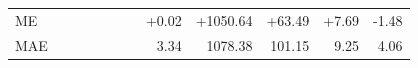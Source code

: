 \begin{tabular}{@{}l r rrrrr rrrrr@{}}
\midrule
ME &  &  &  &  &  &  & \textcolor{pyscfred}{+0.02} & \textcolor{pyscfred}{+1050.64} & \textcolor{pyscfred}{+63.49} & \textcolor{pyscfred}{+7.69} & \textcolor{pyscfred}{-1.48} \\
MAE &  &  &  &  &  &  & \textcolor{pyscfred}{3.34} & \textcolor{pyscfred}{1078.38} & \textcolor{pyscfred}{101.15} & \textcolor{pyscfred}{9.25} & \textcolor{pyscfred}{4.06} \\
\bottomrule
\end{tabular}
